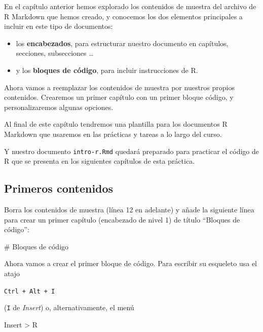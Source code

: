 \documentclass[
  degree=mecinf,
  title=normal,
  toc=normal,
  bib=normal]{mnye}
\newenvironment{Shaded}{\begin{snugshade}}{\end{snugshade}}
\newcommand{\FunctionTok}[1]{\textcolor[rgb]{0.00,0.00,0.00}{#1}}
\begin{document}
En el capítulo anterior hemos explorado los contenidos de muestra del archivo de R Markdown que hemos creado, y conocemos los dos elementos principales a incluir en este tipo de documentos:

\begin{itemize}
\item
  los \textbf{encabezados}, para estructurar nuestro documento en capítulos, secciones, subsecciones \ldots{}
\item
  y los \textbf{bloques de código}, para incluir instrucciones de \textsf{R}.
\end{itemize}

Ahora vamos a reemplazar los contenidos de muestra por nuestros propios contenidos. Crearemos un primer capítulo con un primer bloque código, y personalizaremos algunas opciones.

Al final de este capítulo tendremos una plantilla para los documentos R Markdown que usaremos en las prácticas y tareas a lo largo del curso.

Y nuestro documento \texttt{intro-r.Rmd} quedará preparado para practicar el código de \textsf{R} que se presenta en los siguientes capítulos de esta práctica.

\hypertarget{primeros-contenidos}{%
\subsection{Primeros contenidos}\label{primeros-contenidos}}

Borra los contenidos de muestra (línea 12 en adelante) y añade la siguiente línea para crear un primer capítulo (encabezado de nivel 1) de título ``Bloques de código'':

\begin{Shaded}
\begin{Highlighting}[]
\FunctionTok{\# Bloques de código}
\end{Highlighting}
\end{Shaded}

Ahora vamos a crear el primer bloque de código. Para escribir su esqueleto usa el atajo

\begin{center}
\texttt{Ctrl\ +\ Alt\ +\ I}

\end{center}

(\texttt{I} de \emph{Insert}) o, alternativamente, el menú

\begin{menu}
Insert \textgreater{} R

\end{menu}
\end{document}
